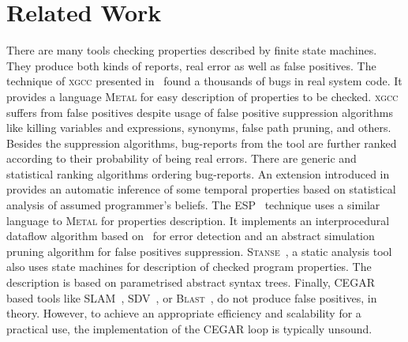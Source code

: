 \documentclass[10pt]{llncs}
\begin{document}



\section{Related Work} \label{sec:related}


There are many tools checking properties described by finite state
machines. They produce both kinds of reports, real error as well as false
positives. The technique of \textsc{xgcc} presented
in~\cite{CEH02,metal,ECC00,pldi02} found a thousands of bugs in real system
code. It provides a language \textsc{Metal} for easy description of properties
to be checked.  \textsc{xgcc} suffers from false positives despite usage of
false positive suppression algorithms like killing
variables and expressions, synonyms, false path pruning, and others. Besides
the suppression algorithms, bug-reports from the tool are further ranked
according to their probability of being real errors. There are generic and
statistical ranking algorithms ordering bug-reports. An extension introduced
in~\cite{ECH01} provides an automatic inference of some temporal properties
based on statistical analysis of assumed programmer's beliefs. The
\textsc{ESP}~\cite{DLS02} technique uses a similar language to
\textsc{Metal} for properties description. It implements an interprocedural
dataflow algorithm based on~\cite{RHS95} for error detection and an abstract
simulation pruning algorithm for false positives
suppression. \textsc{Stanse}~\cite{stanse}, a static analysis tool also uses
state machines for description of checked program properties. The
description is based on parametrised abstract syntax trees.  Finally,
\textsc{CEGAR}~\cite{cegar} based tools like \textsc{SLAM}~\cite{BLR11},
\textsc{SDV}~\cite{BBKL10}, or \textsc{Blast}~\cite{BHJ07}, do not produce
false positives, in theory. However, to achieve an appropriate efficiency
and scalability for a practical use, the implementation of the
\textsc{CEGAR} loop is typically unsound.
\end{document}
